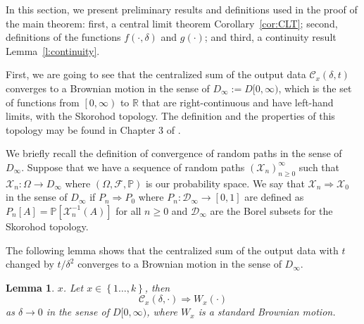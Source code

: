 \documentclass{wscpaperproc}
\theoremstyle{wsc}
\newtheorem{lemma}{Lemma}
\begin{document}
In this section, we present preliminary results and definitions used in the proof of the main theorem: first, a central limit theorem Corollary~\ref{cor:CLT}; second, definitions of the functions $f(\cdot,\delta)$ and $g(\cdot)$; and third, a continuity result Lemma~\ref{l:continuity}.

First, we are going to see that the centralized sum of the output
data $\mathcal{C}_x(\delta,t)$ converges to a Brownian motion in the sense of $D_{\infty}:=D[0,\infty)$,
which is the set of functions from $\left[0,\infty\right)$ to $\mathbb{R}$
that are right-continuous and have left-hand limits, with the Skorohod
topology. The definition and the properties of this topology may be
found in Chapter 3 of . 

We briefly recall the definition of convergence of random paths in
the sense of $D_{\infty}$. Suppose that we have a sequence of random
paths $\left(\mathcal{X}_{n}\right)_{n\geq0}^{\infty}$ such that
$\mathcal{X}_{n}:\varOmega\rightarrow D_{\infty}$ where $\left(\Omega,\mathcal{F},\mathbb{P}\right)$
is our probability space. We say that $\mathcal{X}_{n}\Rightarrow\mathcal{X}_{0}$
in the sense of $D_{\infty}$ if $P_{n}\Rightarrow P_{0}$ where $P_{n}:\mathcal{D}_{\infty}\rightarrow\left[0,1\right]$
are defined as $P_{n}\left[A\right]=\mathbb{P}\left[\mathcal{X}_{n}^{-1}\left(A\right)\right]$
for all $n\geq0$ and $\mathcal{D}_{\infty}$ are the Borel subsets
for the Skorohod topology.

The following lemma shows that the centralized sum of the output
data with $t$ changed by $t/\delta^{2}$ converges to a Brownian
motion in the sense of $D_{\infty}$. 
\\
\begin{lemma}
$x$. 
Let $x\in\left\{ 1\ldots,k\right\} $, then
\[
\mathcal{C}_{x}\left(\delta,\cdot\right)\Rightarrow W_{x}\left(\cdot\right)
\]
as $\delta\rightarrow0$ in the sense of $D[0,\infty)$, where $W_{x}$
is a standard Brownian motion.
\end{lemma}
\end{document}
